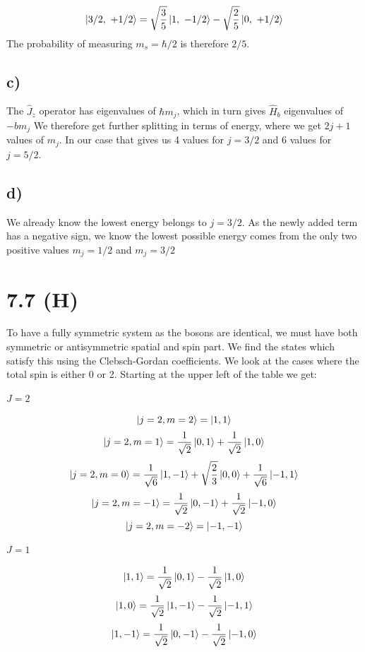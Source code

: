 \documentclass{article}
\begin{document}
\[
\ket{3 / 2,\  +1 / 2} =  \sqrt{\frac{3}{5}} \ket{1,\ -1 / 2} - \sqrt{\frac{2}{5}} \ket{0,\ +1 / 2}
\]
The probability of measuring $m_s = ℏ / 2 $ is therefore $2 / 5$. 

\subsection*{c)}    
The $\hat{J}_z$ operator has eigenvalues of $ℏm_j$, which in turn gives $\hat{H}_b$ eigenvalues of $-bm_j$ We therefore get further splitting in terms of energy, where we get $2j+1$ values of $m_j$. In our case that gives us 4 values for $j = 3 / 2$ and 6 values for $j = 5 / 2$. 

\subsection*{d)}
We already know the lowest energy belongs to $j = 3 / 2$. As the newly added term has a negative sign, we know the lowest possible energy comes from the only two positive values $m_j = 1 / 2$ and $m_j = 3 / 2$

\section*{7.7 (H)}
To have a fully symmetric system as the bosons are identical, we must have both symmetric or antisymmetric spatial and spin part. We find the states which satisfy this using the Clebsch-Gordan coefficients. We look at the cases where the total spin is either  0 or 2. Starting at the upper left of the table we get:
\paragraph{$J = 2$}
\[
\ket{j=2, m=2} = \ket{1,1}
\]
\[
\ket{j=2, m=1} = \frac{1}{\sqrt{2}} \ket{0,1} + \frac{1}{\sqrt{2}} \ket{1,0}
\]
\[
\ket{j=2, m=0} = \frac{1}{\sqrt{6}}\ket{1,-1} + \sqrt{\frac{2}{3}}\ket{0,0} + \frac{1}{\sqrt{6}}\ket{-1,1}
\]
\[
\ket{j=2, m=-1} = \frac{1}{\sqrt{2}}\ket{0,-1} + \frac{1}{\sqrt{2}}\ket{-1,0}
\]
\[
\ket{j=2, m=-2} = \ket{-1,-1}
\]

\paragraph{$J = 1$}
\[
\ket{1,1} = \frac{1}{\sqrt{2}} \ket{0,1} - \frac{1}{\sqrt{2}} \ket{1,0}
\]
\[
\ket{1,0} = \frac{1}{\sqrt{2}} \ket{1,-1} - \frac{1}{\sqrt{2}} \ket{-1,1}
\]
\[
\ket{1,-1} = \frac{1}{\sqrt{2}} \ket{0,-1} - \frac{1}{\sqrt{2}} \ket{-1,0}
\]
\end{document}
